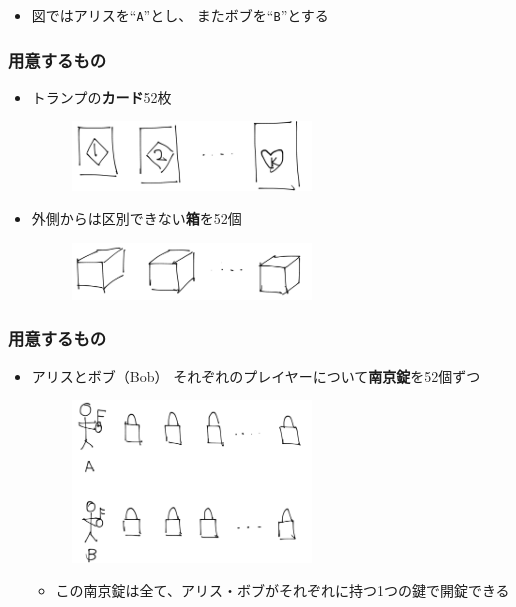 \begin{frame}
  \begin{itemize}
    \item 図ではアリスを``\texttt{A}''とし、
    またボブを``\texttt{B}''とする
  \end{itemize}
\end{frame}

\begin{frame}
  \frametitle{用意するもの}

  \pause
  \begin{itemize}
    \item<+-> トランプの\textbf{カード}52枚
    \begin{figure}[h]
      \includegraphics[width=0.6\textwidth]{img/cards.png}
    \end{figure}
   
    \item<+-> 外側からは区別できない\textbf{箱}を52個
    \begin{figure}[h]
      \includegraphics[width=0.6\textwidth]{img/boxes.png}
    \end{figure}
  \end{itemize}
\end{frame}

\begin{frame}
  \frametitle{用意するもの}

  \begin{itemize}
    \item<+-> アリスとボブ（Bob）
    それぞれのプレイヤーについて\textbf{南京錠}を52個ずつ
    \begin{figure}[h]
      \includegraphics[width=0.6\textwidth]{img/padlocks.png}
    \end{figure}
    \begin{itemize}
      \item この南京錠は全て、アリス・ボブがそれぞれに持つ1つの鍵で開錠できる
    \end{itemize}    
  \end{itemize}
\end{frame}

